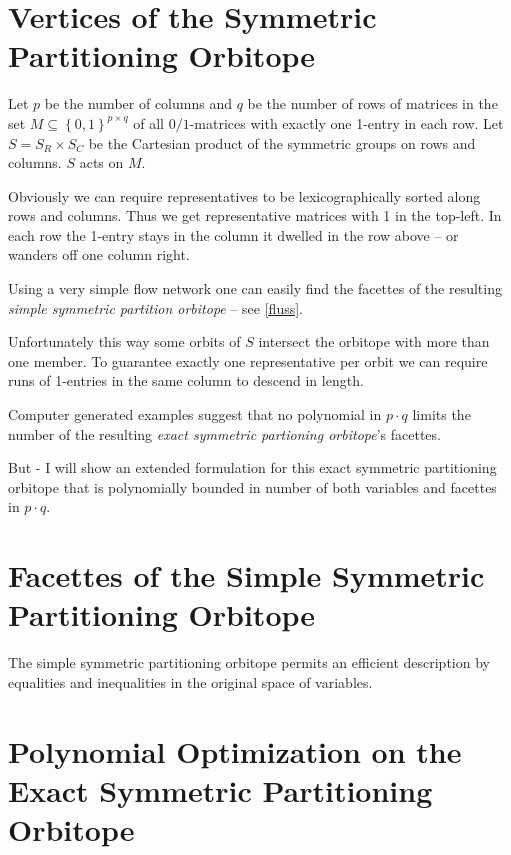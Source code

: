 \documentclass{article}
\begin{document}
\section{Vertices of the Symmetric Partitioning Orbitope}
Let $p$ be the number of columns and $q$ be the number of rows of
matrices in the set \(M \subseteq \left\{0,1\right\}^{p\times q}\) of all
$0/1$-matrices with exactly one 1-entry in each row.  Let \(S = S_R
\times S_C\) be the Cartesian product of the symmetric groups on rows
and columns.  \(S\) acts on \(M\).


Obviously we can require representatives to be lexicographically
sorted along rows and columns.  Thus we get representative matrices
with 1 in the top-left.  In each row the 1-entry stays in the column
it dwelled in the row above -- or wanders off one column right.

Using a very simple flow network one can easily find the facettes of
the resulting \textit{simple symmetric partition orbitope} -- see
\ref{fluss}.

Unfortunately this way some orbits of $S$ intersect the orbitope with
more than one member.  To guarantee exactly one representative per
orbit we can require runs of 1-entries in the same column to descend
in length.

Computer generated examples suggest that no polynomial in \(p \cdot
q\) limits the number of the resulting \textit{exact symmetric partioning
orbitope}'s facettes.

But - I will show an extended formulation for this exact symmetric
partitioning orbitope that is polynomially bounded in number of both
variables and facettes in \(p \cdot q\).

\section{Facettes of the Simple Symmetric Partitioning Orbitope}

The simple symmetric partitioning orbitope permits an efficient
description by equalities and inequalities in the original space of
variables.



\section{Polynomial Optimization on the Exact Symmetric Partitioning
  Orbitope}





\end{document}
